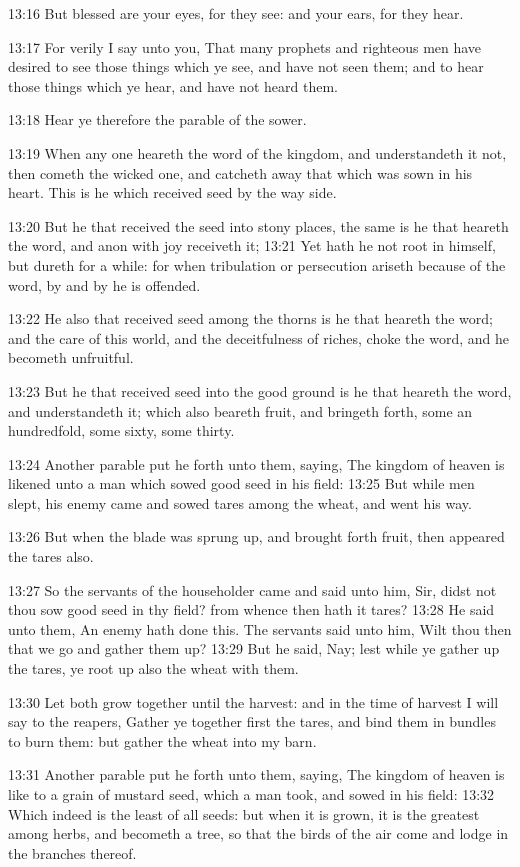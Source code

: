 13:16 But blessed are your eyes, for they see: and your ears, for they hear.

13:17 For verily I say unto you, That many prophets and righteous men have desired to see those things which ye see, and have not seen them; and to hear those things which ye hear, and have not heard them.

13:18 Hear ye therefore the parable of the sower.

13:19 When any one heareth the word of the kingdom, and understandeth it not, then cometh the wicked one, and catcheth away that which was sown in his heart. This is he which received seed by the way side.

13:20 But he that received the seed into stony places, the same is he that heareth the word, and anon with joy receiveth it; 13:21 Yet hath he not root in himself, but dureth for a while: for when tribulation or persecution ariseth because of the word, by and by he is offended.

13:22 He also that received seed among the thorns is he that heareth the word; and the care of this world, and the deceitfulness of riches, choke the word, and he becometh unfruitful.

13:23 But he that received seed into the good ground is he that heareth the word, and understandeth it; which also beareth fruit, and bringeth forth, some an hundredfold, some sixty, some thirty.

13:24 Another parable put he forth unto them, saying, The kingdom of heaven is likened unto a man which sowed good seed in his field: 13:25 But while men slept, his enemy came and sowed tares among the wheat, and went his way.

13:26 But when the blade was sprung up, and brought forth fruit, then appeared the tares also.

13:27 So the servants of the householder came and said unto him, Sir, didst not thou sow good seed in thy field? from whence then hath it tares?  13:28 He said unto them, An enemy hath done this. The servants said unto him, Wilt thou then that we go and gather them up?  13:29 But he said, Nay; lest while ye gather up the tares, ye root up also the wheat with them.

13:30 Let both grow together until the harvest: and in the time of harvest I will say to the reapers, Gather ye together first the tares, and bind them in bundles to burn them: but gather the wheat into my barn.

13:31 Another parable put he forth unto them, saying, The kingdom of heaven is like to a grain of mustard seed, which a man took, and sowed in his field: 13:32 Which indeed is the least of all seeds: but when it is grown, it is the greatest among herbs, and becometh a tree, so that the birds of the air come and lodge in the branches thereof.

